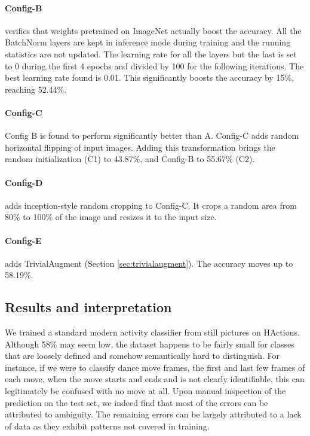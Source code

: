 \paragraph{Config-B} verifies that weights pretrained on ImageNet actually boost the accuracy. All the BatchNorm layers are kept in inference mode during training and the running statistics are not updated. The learning rate for all the layers but the last is set to 0 during the first 4 epochs and divided by 100 for the following iterations. The best learning rate found is 0.01. This significantly boosts the accuracy by 15\%, reaching 52.44\%.

\paragraph{Config-C} Config B is found to perform significantly better than A. Config-C adds random horizontal flipping of input images. Adding this transformation brings the random initialization (C1) to 43.87\%, and Config-B to 55.67\% (C2).

\paragraph{Config-D} adds inception-style random cropping to Config-C. It crops a random area from 80\% to 100\% of the image and resizes it to the input size.

\paragraph{Config-E} adds TrivialAugment (Section \ref{sec:trivialaugment}). The accuracy moves up to 58.19\%.

\subsection{Results and interpretation}

We trained a standard modern activity classifier from still pictures on HActions. Although 58\% may seem low, the dataset happens to be fairly small for classes that are loosely defined and somehow semantically hard to distinguish. For instance, if we were to classify dance move frames, the first and last few frames of each move, when the move starts and ends and is not clearly identifiable, this can legitimately be confused with no move at all. Upon manual inspection of the prediction on the test set, we indeed find that most of the errors can be attributed to ambiguity. The remaining errors can be largely attributed to a lack of data as they exhibit patterns not covered in training.

